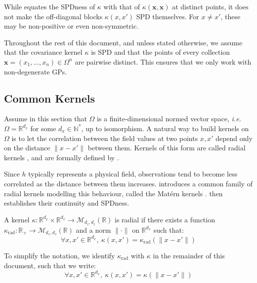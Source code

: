 \begin{remark}
	While  equates the SPDness of $\kappa$ with that of $\kappa(\mathbf{x},\mathbf{x})$ at distinct points, it does not make the off-diagonal blocks $\kappa(x,x')$ SPD themselves. For $x\neq x'$, these may be non-positive or even non-symmetric.
\end{remark}

Throughout the rest of this document, and unless stated otherwise, we assume that the covariance kernel $\kappa$ is SPD and that the points of every collection $\mathbf{x}=(x_1,\dots,x_n)\in\Omega^n$ are pairwise distinct. This ensures that we only work with non-degenerate GPs.

\subsection{Common Kernels}\label{sec:covariance_kernels}

Assume in this section that $\Omega$ is a finite-dimensional normed vector space, \textit{i.e.} $\Omega=\mathbb{R}^{d_x}$ for some $d_x\in\mathbb{N}^*$, up to isomorphism. A natural way to build kernels on $\Omega$ is to let the correlation between the field values at two points $x,x'$ depend only on the distance $\|x-x'\|$ between them. Kernels of this form are called radial kernels \cite{bib:Stein-kriging}, and are formally defined by .

Since $h$ typically represents a physical field, observations tend to become less correlated as the distance between them increases.  introduces a common family of radial kernels modelling this behaviour, called the Matérn kernels \cite{bib:Matérn}.  then establishes their continuity and SPDness.

\begin{definition}\label{th:radial_kernel}
	A kernel $\kappa:\mathbb{R}^{d_x}\times\mathbb{R}^{d_x}\to\mathcal{M}_{d_z,d_z}(\mathbb{R})$ is radial if there exists a function $\kappa_{\mathrm{rad}}:\mathbb{R}_+\to\mathcal{M}_{d_z,d_z}(\mathbb{R})$ and a norm $\|\cdot\|$ on $\mathbb{R}^{d_x}$ such that:
	\begin{equation}
		\forall x,x'\in\mathbb{R}^{d_x},\:\kappa(x,x')=\kappa_{\mathrm{rad}}(\|x-x'\|)
	\end{equation}

	To simplify the notation, we identify $\kappa_{\mathrm{rad}}$ with $\kappa$ in the remainder of this document, such that we write:
	\begin{equation}
		\forall x,x'\in\mathbb{R}^{d_x},\:\kappa(x,x')=\kappa(\|x-x'\|)
	\end{equation}
\end{definition}


